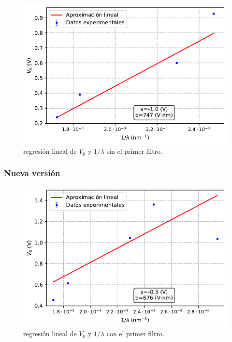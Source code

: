 \documentclass[12pt,a4paper]{article}
\numberwithin{equation}{section}
\numberwithin{table}{section}
\numberwithin{figure}{section}
\begin{document}
\begin{figure}[h!]  \centering
\includegraphics[scale=0.97]{Metodo_3-Clasico-sin.pdf}
\caption{regresión lineal de $V_0$ y $1/\lambda$ sin el primer filtro.}
\label{Fig:6.5.2}
\end{figure}
\newpage

\subsubsection{Nueva versión}

\begin{figure}[h!]  \centering
\includegraphics[scale=0.97]{Metodo_3-Nuevo-con.pdf}
\caption{regresión lineal de $V_0$ y $1/\lambda$ con el primer filtro.}
\label{Fig:6.5.3}
\end{figure}
\end{document}
